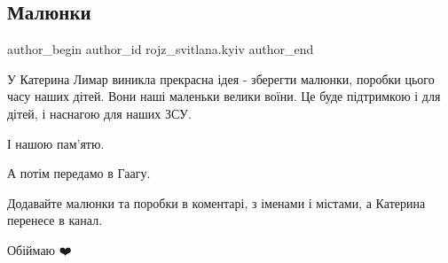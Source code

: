  
 
 
 
 
 
\subsection{Малюнки}
\label{sec:27_02_2022.fb.rojz_svitlana.kyiv.1.maljunky}
 
\ifcmt
 author_begin
   author_id rojz_svitlana.kyiv
 author_end
\fi

У Катерина Лимар виникла прекрасна ідея - зберегти малюнки, поробки цього часу
наших дітей. Вони наші маленьки велики воїни. Це буде підтримкою і для дітей, і
наснагою для наших ЗСУ. 

І нашою пам'ятю. 

А потім передамо в Гаагу. 

Додавайте малюнки та поробки в коментарі, з іменами і містами, а Катерина
перенесе в канал. 

Обіймаю ❤️

